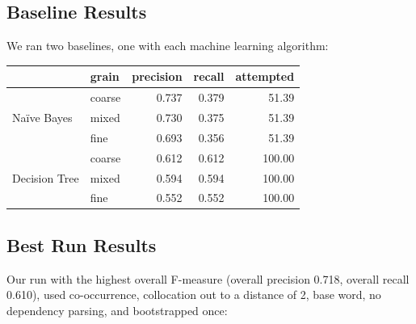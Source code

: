 \documentclass{article}
\newcommand{\Naive}{Na\"ive}
\begin{document}
\subsection{Baseline Results}

We ran two baselines, one with each machine learning algorithm:

\begin{tabular}{l l | r r r}
& grain& precision& recall& attempted\\
\hline
\multirow{3}{*}{\Naive{} Bayes} &
coarse  &  0.737 & 0.379 &   51.39\\
&mixed  &  0.730 & 0.375 &   51.39\\
& fine  &  0.693 & 0.356 &   51.39\\
\multirow{3}{*}{Decision Tree} &
coarse  &  0.612 & 0.612 &  100.00\\
&mixed  &  0.594 & 0.594 &  100.00\\
& fine  &  0.552 & 0.552 &  100.00\\
\end{tabular}

\subsection{Best Run Results}

Our run with the highest overall F-measure (overall precision 0.718, overall
recall 0.610), used co-occurrence, collocation out to a distance of 2, base word,
no dependency parsing, and bootstrapped once:
\end{document}

